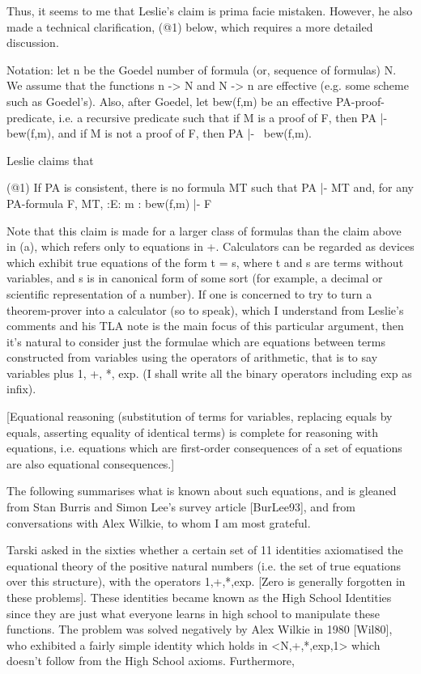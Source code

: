 \begin{spec}
Thus, it seems to me that Leslie's claim is prima facie mistaken.
However, he also made a technical clarification, (@1) below, which
requires a more detailed discussion.

Notation: let n be the Goedel number of formula (or, sequence of
formulas) N.  We assume that the functions n -> N and N -> n are
effective (e.g. some scheme such as Goedel's). Also, after Goedel,
let bew(f,m) be an effective PA-proof-predicate, i.e. a recursive
predicate such that if M is a proof of F, then PA |- bew(f,m), and
if M is not a proof of F, then PA |- ~bew(f,m).

Leslie claims that 

(@1) If PA is consistent, there is no formula MT
     such that PA |- MT and, for any PA-formula F, 
     MT, :E: m : bew(f,m) |- F

Note that this claim is made for a larger class of formulas than the
claim above in (a), which refers only to equations in +.
Calculators can be regarded as devices which exhibit true equations
of the form t = s, where t and s are terms without variables, and s
is in canonical form of some sort (for example, a decimal or
scientific representation of a number).  If one is concerned to try
to turn a theorem-prover into a calculator (so to speak), which I
understand from Leslie's comments and his TLA note is the main focus
of this particular argument, then it's natural to consider just the
formulae which are equations between terms constructed from
variables using the operators of arithmetic, that is to say
variables plus 1, +, *, exp. (I shall write all the binary operators
including exp as infix).

[Equational reasoning (substitution of terms for variables,
replacing equals by equals, asserting equality of identical terms)
is complete for reasoning with equations, i.e.  equations which are
first-order consequences of a set of equations are also equational
consequences.]

The following summarises what is known about such equations, and is
gleaned from Stan Burris and Simon Lee's survey article [BurLee93],
and from conversations with Alex Wilkie, to whom I am most grateful.

Tarski asked in the sixties whether a certain set of 11 identities
axiomatised the equational theory of the positive natural numbers
(i.e. the set of true equations over this structure), with the
operators 1,+,*,exp.  [Zero is generally forgotten in these
problems].  These identities became known as the High School
Identities since they are just what everyone learns in high school
to manipulate these functions.  The problem was solved negatively by
Alex Wilkie in 1980 [Wil80], who exhibited a fairly simple identity
which holds in <N,+,*,exp,1> which doesn't follow from the High
School axioms.  Furthermore,


\end{spec}

